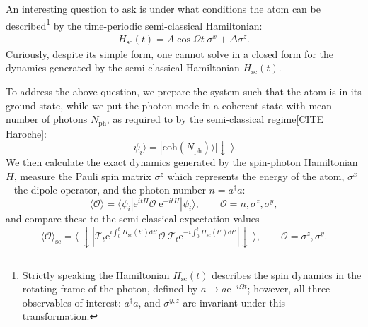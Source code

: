 \documentclass{SciPost}
\newcommand\0{\scalebox{-1}[1]{0}}
\begin{document}
An interesting question to ask is under what conditions the atom can be described\footnote{Strictly speaking the Hamiltonian $H_\mathrm{sc}(t)$ describes the spin dynamics in the rotating frame of the photon, defined by $a\to a\mathrm e^{-i\Omega t}$; however, all three observables of interest: $a^\dagger a$, and $\sigma^{y,z}$ are invariant under this transformation.} by the time-periodic semi-classical Hamiltonian:
\begin{eqnarray}
H_\mathrm{sc}(t) = A\cos\Omega t\;\sigma^x + \Delta\sigma^z. 
\end{eqnarray}
Curiously, despite its simple form, one cannot solve in a closed form for the dynamics generated by the semi-classical Hamiltonian $H_\mathrm{sc}(t)$. 

To address the above question, we prepare the system such that the atom is in its ground state, while we put the photon mode in a coherent state with mean number of photons $N_\mathrm{ph}$, as required to by the semi-classical regime[CITE Haroche]: 
\begin{equation}
|\psi_i\rangle = |\mathrm{coh}(N_\mathrm{ph})\rangle|\downarrow\; \rangle.
\label{eq:psi_i_sp_ph}
\end{equation}
We then calculate the exact dynamics generated by the spin-photon Hamiltonian $H$, measure the Pauli spin matrix $\sigma^z$ which represents the energy of the atom, $\sigma^x$ -- the dipole operator, and the photon number $n=a^\dagger a$:
\begin{equation}
\langle \mathcal{O}\rangle = \langle\psi_i|\mathrm e^{itH}\mathcal{O}\;\mathrm e^{-itH}|\psi_i\rangle, \qquad \mathcal{O} = n,\sigma^z,\sigma^y,
\end{equation}
and compare these to the semi-classical expectation values
\begin{equation}
\langle \mathcal{O}\rangle_\mathrm{sc} = \langle\;\downarrow|\mathcal{T}_t \mathrm e^{i\int^t_0 H_\mathrm{sc}(t')\mathrm{d}t'}\mathcal{O}\;\mathcal{T}_t \mathrm e^{-i\int^t_0 H_\mathrm{sc}(t')\mathrm{d}t'}|\downarrow\;\rangle, \qquad \mathcal{O} = \sigma^z,\sigma^y.
\end{equation}
\end{document}
